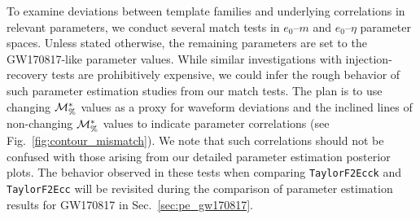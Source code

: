 \documentclass[aps,prd,twocolumn,superscriptaddress,groupedaddress,nofootinbib,showpacs,eqsecnum,useAms]{revtex4-2}
\begin{document}
To examine deviations between template families and underlying correlations in 
relevant 
parameters, we conduct several match tests in $e_0$--$m$ and $e_0$--$\eta$ parameter spaces.
 Unless stated otherwise, the remaining parameters are set to the GW170817-like parameter values.
 While similar investigations with injection-recovery tests are
prohibitively
expensive, we could infer the rough behavior of such parameter estimation studies from our match tests. 
The plan is to use changing ${\cal M}^*_\%$ values as a proxy for waveform deviations and the inclined lines of non-changing ${\cal M}^*_\%$ values to indicate parameter correlations (see Fig.~\ref{fig:contour_mismatch}). 
We note that such correlations should not be confused with those arising from our detailed parameter estimation posterior plots. The behavior observed in these tests when comparing \texttt{TaylorF2Ecck} and \texttt{TaylorF2Ecc} will be revisited during the comparison of parameter estimation results for GW170817 in Sec.~\ref{sec:pe_gw170817}.
\end{document}
